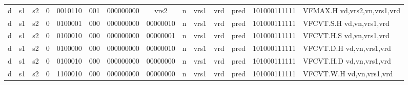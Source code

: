\begin{landscape}
\begin{table}[p]
\begin{small}
\begin{center}
\begin{tabular}{p{0.08in}@{}p{0.08in}@{}p{0.08in}@{}p{0.08in}@{}p{0.50in}@{}p{0.30in}@{}p{0.08in}@{}p{0.8in}@{}p{0.48in}@{}p{0.32in}@{}p{0.08in}@{}p{0.8in}@{}p{0.8in}@{}p{0.4in}@{}p{0.56in}l}
\multicolumn{1}{|c|}{d} &
\multicolumn{1}{c|}{s1} &
\multicolumn{1}{c|}{s2} &
\multicolumn{1}{c|}{0} &
\multicolumn{1}{c|}{0010110} &
\multicolumn{1}{c|}{001} &
\multicolumn{2}{c|}{000000000} &
\multicolumn{2}{c|}{vrs2} &
\multicolumn{1}{c|}{n} &
\multicolumn{1}{c|}{vrs1} &
\multicolumn{1}{c|}{vrd} &
\multicolumn{1}{c|}{pred} &
\multicolumn{1}{c|}{101000111111} & VFMAX.H vd,vrs2,vn,vrs1,vrd \\
\cline{1-15}
  

\multicolumn{1}{|c|}{d} &
\multicolumn{1}{c|}{s1} &
\multicolumn{1}{c|}{s2} &
\multicolumn{1}{c|}{0} &
\multicolumn{1}{c|}{0100001} &
\multicolumn{1}{c|}{000} &
\multicolumn{2}{c|}{000000000} &
\multicolumn{2}{c|}{00000010} &
\multicolumn{1}{c|}{n} &
\multicolumn{1}{c|}{vrs1} &
\multicolumn{1}{c|}{vrd} &
\multicolumn{1}{c|}{pred} &
\multicolumn{1}{c|}{101000111111} & VFCVT.S.H vd,vn,vrs1,vrd \\
\cline{1-15}
  

\multicolumn{1}{|c|}{d} &
\multicolumn{1}{c|}{s1} &
\multicolumn{1}{c|}{s2} &
\multicolumn{1}{c|}{0} &
\multicolumn{1}{c|}{0100010} &
\multicolumn{1}{c|}{000} &
\multicolumn{2}{c|}{000000000} &
\multicolumn{2}{c|}{00000001} &
\multicolumn{1}{c|}{n} &
\multicolumn{1}{c|}{vrs1} &
\multicolumn{1}{c|}{vrd} &
\multicolumn{1}{c|}{pred} &
\multicolumn{1}{c|}{101000111111} & VFCVT.H.S vd,vn,vrs1,vrd \\
\cline{1-15}
  

\multicolumn{1}{|c|}{d} &
\multicolumn{1}{c|}{s1} &
\multicolumn{1}{c|}{s2} &
\multicolumn{1}{c|}{0} &
\multicolumn{1}{c|}{0100000} &
\multicolumn{1}{c|}{000} &
\multicolumn{2}{c|}{000000000} &
\multicolumn{2}{c|}{00000010} &
\multicolumn{1}{c|}{n} &
\multicolumn{1}{c|}{vrs1} &
\multicolumn{1}{c|}{vrd} &
\multicolumn{1}{c|}{pred} &
\multicolumn{1}{c|}{101000111111} & VFCVT.D.H vd,vn,vrs1,vrd \\
\cline{1-15}
  

\multicolumn{1}{|c|}{d} &
\multicolumn{1}{c|}{s1} &
\multicolumn{1}{c|}{s2} &
\multicolumn{1}{c|}{0} &
\multicolumn{1}{c|}{0100010} &
\multicolumn{1}{c|}{000} &
\multicolumn{2}{c|}{000000000} &
\multicolumn{2}{c|}{00000000} &
\multicolumn{1}{c|}{n} &
\multicolumn{1}{c|}{vrs1} &
\multicolumn{1}{c|}{vrd} &
\multicolumn{1}{c|}{pred} &
\multicolumn{1}{c|}{101000111111} & VFCVT.H.D vd,vn,vrs1,vrd \\
\cline{1-15}
  

\multicolumn{1}{|c|}{d} &
\multicolumn{1}{c|}{s1} &
\multicolumn{1}{c|}{s2} &
\multicolumn{1}{c|}{0} &
\multicolumn{1}{c|}{1100010} &
\multicolumn{1}{c|}{000} &
\multicolumn{2}{c|}{000000000} &
\multicolumn{2}{c|}{00000000} &
\multicolumn{1}{c|}{n} &
\multicolumn{1}{c|}{vrs1} &
\multicolumn{1}{c|}{vrd} &
\multicolumn{1}{c|}{pred} &
\multicolumn{1}{c|}{101000111111} & VFCVT.W.H vd,vn,vrs1,vrd \\
\cline{1-15}
  


\end{tabular}
\end{center}
\end{small}
\end{table}
\end{landscape}
